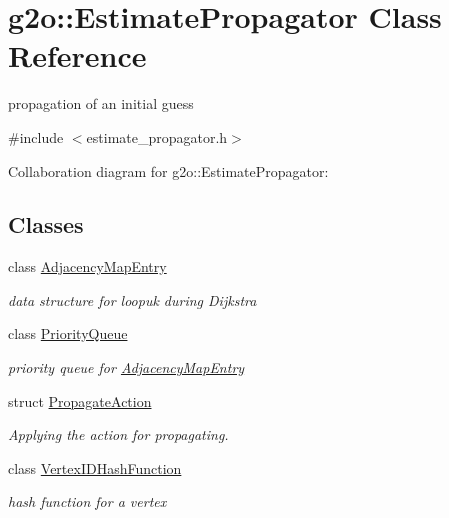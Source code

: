 \hypertarget{classg2o_1_1EstimatePropagator}{}\section{g2o\+:\+:Estimate\+Propagator Class Reference}
\label{classg2o_1_1EstimatePropagator}


propagation of an initial guess  




{\ttfamily \#include $<$estimate\+\_\+propagator.\+h$>$}



Collaboration diagram for g2o\+:\+:Estimate\+Propagator\+:
\subsection*{Classes}
\begin{DoxyCompactItemize}
\item 
class \hyperlink{classg2o_1_1EstimatePropagator_1_1AdjacencyMapEntry}{Adjacency\+Map\+Entry}
\begin{DoxyCompactList}\small\item\em data structure for loopuk during Dijkstra \end{DoxyCompactList}\item 
class \hyperlink{classg2o_1_1EstimatePropagator_1_1PriorityQueue}{Priority\+Queue}
\begin{DoxyCompactList}\small\item\em priority queue for \hyperlink{classg2o_1_1EstimatePropagator_1_1AdjacencyMapEntry}{Adjacency\+Map\+Entry} \end{DoxyCompactList}\item 
struct \hyperlink{structg2o_1_1EstimatePropagator_1_1PropagateAction}{Propagate\+Action}
\begin{DoxyCompactList}\small\item\em Applying the action for propagating. \end{DoxyCompactList}\item 
class \hyperlink{classg2o_1_1EstimatePropagator_1_1VertexIDHashFunction}{Vertex\+I\+D\+Hash\+Function}
\begin{DoxyCompactList}\small\item\em hash function for a vertex \end{DoxyCompactList}\end{DoxyCompactItemize}
